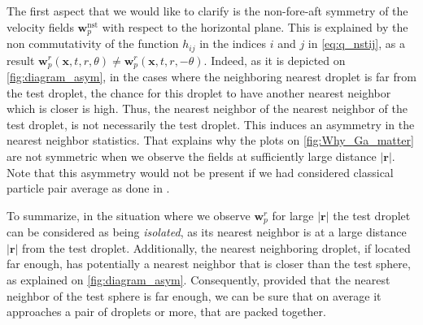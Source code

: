 The first aspect that we would like to clarify is the non-fore-aft symmetry of the velocity fields $\textbf{w}_p^\text{nst}$ with respect to the horizontal plane. 
This is explained by the non commutativity of the function $h_{ij}$ in the indices $i$ and $j$ in \ref{eq:q_nstij}, as a result $\textbf{w}_p^r(\textbf{x},t,r,\theta) \neq \textbf{w}_p^r(\textbf{x},t,r,-\theta)$. 
Indeed, as it is depicted on \ref{fig:diagram_asym}, in the cases where the neighboring nearest droplet is far from the test droplet, the chance for this droplet to have another nearest neighbor which is closer is high. 
Thus, the nearest neighbor of the nearest neighbor of the test droplet, is not necessarily the test droplet. 
This induces an asymmetry in the nearest neighbor statistics. 
That explains why the plots on \ref{fig:Why_Ga_matter} are not symmetric when we observe the fields at sufficiently large distance $|\textbf{r}|$. 
Note that this asymmetry would not be present if we had considered classical particle pair average as done in \cite{shajahan2023inertial}. 

To summarize, in the situation where we observe $\textbf{w}_p^r$ for large $|\textbf{r}|$ the test droplet can be considered as being \textit{isolated}, as its nearest neighbor is at a large distance $|\textbf{r}|$ from the test droplet. 
Additionally, the nearest neighboring droplet, if located far enough, has 
potentially a nearest neighbor that is closer than the test sphere, as explained on \ref{fig:diagram_asym}. 
Consequently, provided that the nearest neighbor of the test sphere is far enough, we can be sure that on average it approaches a pair of droplets or more, that are packed together. 

